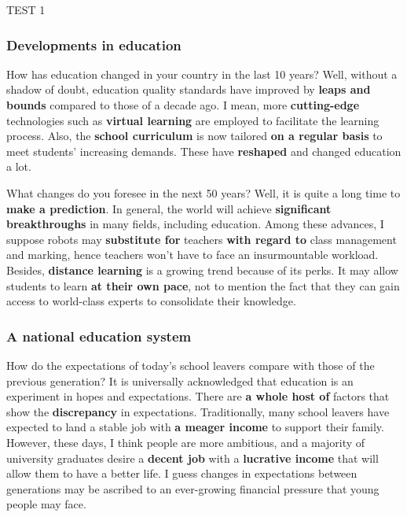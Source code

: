 \begin{glossarymc}[Cambridge 3]
\begin{test}{TEST 1}
\subsubsection*{Developments in education}
\begin{qa}{How has education changed in your country in the last 10 years?}
    Well, without a shadow of doubt, education quality standards have improved by \textbf{leaps and bounds} compared to those of a decade ago. 
    I mean, more \textbf{cutting-edge} technologies such as \textbf{virtual learning} are employed to facilitate the learning process. 
    Also, the \textbf{school curriculum} is now tailored \textbf{on a regular basis} to meet students' increasing demands. 
    These have \textbf{reshaped} and changed education a lot.
\end{qa}

\begin{qa}{What changes do you foresee in the next 50 years?}
    Well, it is quite a long time to \textbf{make a prediction}. 
    In general, the world will achieve \textbf{significant breakthroughs} in many fields, including education. 
    Among these advances, I suppose robots may \textbf{substitute for} teachers \textbf{with regard to} class management and marking, hence teachers won't have to face an insurmountable workload. 
    Besides, \textbf{distance learning} is a growing trend because of its perks. 
    It may allow students to learn \textbf{at their own pace}, not to mention the fact that they can gain access to world-class experts to consolidate their knowledge.
\end{qa}

\subsubsection*{A national education system}

\begin{qa}{How do the expectations of today's school leavers compare with those of the previous generation?}
    It is universally acknowledged that education is an experiment in hopes and expectations. 
    There are \textbf{a whole host of} factors that show the \textbf{discrepancy} in expectations. 
    Traditionally, many school leavers have expected to land a stable job with \textbf{a meager income} to support their family. 
    However, these days, I think people are more ambitious, and a majority of university graduates desire a \textbf{decent job} with a \textbf{lucrative income} that will allow them to have a better life. 
    I guess changes in expectations between generations may be ascribed to an ever-growing financial pressure that young people may face.
\end{qa}


\end{test}
\end{glossarymc}
